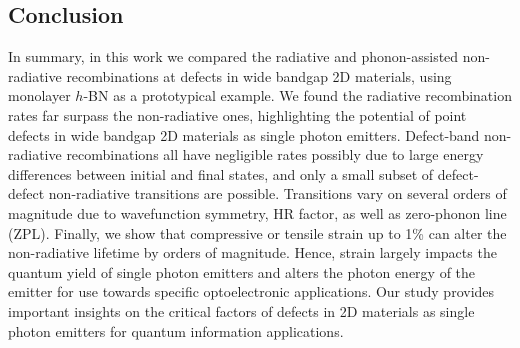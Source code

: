 \subsection{Conclusion}

In summary, in this work we compared the radiative and phonon-assisted non-radiative recombinations at defects in wide bandgap 2D materials, using monolayer $h$-BN as a prototypical example. We found the radiative recombination rates far surpass the non-radiative ones, highlighting the potential of point defects in wide bandgap 2D materials as single photon emitters. Defect-band non-radiative recombinations all have negligible rates possibly due to large energy differences between initial and final states, and only a small subset of defect-defect non-radiative transitions are possible. Transitions vary on several orders of magnitude due to wavefunction symmetry, HR factor, as well as zero-phonon line (ZPL). Finally, we show that compressive or tensile strain up to 1\% can alter the non-radiative lifetime by orders of magnitude.
Hence, strain largely impacts the quantum yield of single photon emitters and alters the photon energy of the emitter for use towards specific optoelectronic applications. Our study provides important insights on the critical factors of defects in 2D materials as single photon emitters for quantum information applications.
